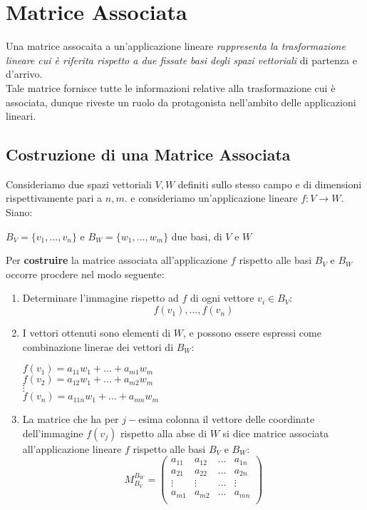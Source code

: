 \section{Matrice Associata}
Una matrice assocaita a un'applicazione lineare \emph{rappresenta la trasformazione lineare cui è riferita rispetto a due fissate basi degli spazi vettoriali} di partenza e d'arrivo.
\\Tale matrice fornisce tutte le informazioni relative alla trasformazione cui è associata, dunque riveste un ruolo da protagonista nell'ambito delle applicazioni lineari.

\subsection{Costruzione di una Matrice Associata}
Consideriamo due spazi vettoriali $V,W$ definiti sullo stesso campo e di dimensioni rispettivamente pari a $n,m$.
e consideriamo un'applicazione lineare $f:V\to W$.
\\Siano:
\begin{center}
	$B_V = \{v_1,...,v_n\}$ e $B_W=\{w_1,...,w_m\}$ due basi, di $V$ e $W$
\end{center}
Per \textbf{costruire} la matrice associata all'applicazione $f$ rispetto alle basi $B_V$ e $B_W$ occorre procdere nel modo seguente:
\begin{enumerate}
	\item Determinare l'immagine rispetto ad $f$ di ogni vettore $v_i \in B_V$:
	      \[ f(v_1),...,f(v_n)\]
	\item I vettori ottenuti sono elementi di $W$, e possono essere espressi come combinazione linerae dei vettori di $B_W$:
	\begin{center}
        $f(v_1) = a_{11}w_1 + ... + a_{m1}w_m $
        \\ $f(v_2) = a_{12}w_1 + ... + a_{m2}w_m $
        \\$ \vdots$
        \\$f(v_n) = a_{11n}w_1 + ... + a_{mn}w_m $
    \end{center}
    \item La matrice che ha per $j-$esima colonna il vettore delle coordinate dell'immagine $f(v_j)$ rispetto alla abse di $W$ si dice matrice associata all'applicazione lineare $f$ rispetto alle basi $B_V$ e $B_W$:
    \[ M_{B_V}^{B_W}			 = 
        \begin{pmatrix}
            a_{11} & a_{12} & ... & a_{1n} \\
            a_{21} & a_{22} & ... & a_{2n} \\
            \vdots & \vdots & ... & \vdots \\
            a_{m1} & a_{m2} & ... & a_{mn} \\
        \end{pmatrix}
    \]
\end{enumerate}

